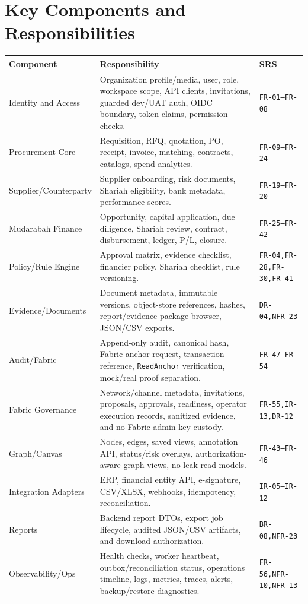 \documentclass[11pt,a4paper]{article}
\newcommand{\req}[1]{\texttt{#1}}
\begin{document}
\section{Key Components and Responsibilities}
\begin{longtable}{L{42mm}L{72mm}L{32mm}}
\toprule
\textbf{Component} & \textbf{Responsibility} & \textbf{SRS} \\
\midrule
Identity and Access & Organization profile/media, user, role, workspace scope, API clients, invitations, guarded dev/UAT auth, OIDC boundary, token claims, permission checks. & \req{FR-01--FR-08} \\
Procurement Core & Requisition, RFQ, quotation, PO, receipt, invoice, matching, contracts, catalogs, spend analytics. & \req{FR-09--FR-24} \\
Supplier/Counterparty & Supplier onboarding, risk documents, Shariah eligibility, bank metadata, performance scores. & \req{FR-19--FR-20} \\
Mudarabah Finance & Opportunity, capital application, due diligence, Shariah review, contract, disbursement, ledger, P/L, closure. & \req{FR-25--FR-42} \\
Policy/Rule Engine & Approval matrix, evidence checklist, financier policy, Shariah checklist, rule versioning. & \req{FR-04,FR-28,FR-30,FR-41} \\
Evidence/Documents & Document metadata, immutable versions, object-store references, hashes, report/evidence package browser, JSON/CSV exports. & \req{DR-04,NFR-23} \\
Audit/Fabric & Append-only audit, canonical hash, Fabric anchor request, transaction reference, \texttt{ReadAnchor} verification, mock/real proof separation. & \req{FR-47--FR-54} \\
Fabric Governance & Network/channel metadata, invitations, proposals, approvals, readiness, operator execution records, sanitized evidence, and no Fabric admin-key custody. & \req{FR-55,IR-13,DR-12} \\
Graph/Canvas & Nodes, edges, saved views, annotation API, status/risk overlays, authorization-aware graph views, no-leak read models. & \req{FR-43--FR-46} \\
Integration Adapters & ERP, financial entity API, e-signature, CSV/XLSX, webhooks, idempotency, reconciliation. & \req{IR-05--IR-12} \\
Reports & Backend report DTOs, export job lifecycle, audited JSON/CSV artifacts, and download authorization. & \req{BR-08,NFR-23} \\
Observability/Ops & Health checks, worker heartbeat, outbox/reconciliation status, operations timeline, logs, metrics, traces, alerts, backup/restore diagnostics. & \req{FR-56,NFR-10,NFR-13} \\
\bottomrule
\end{longtable}
\end{document}
